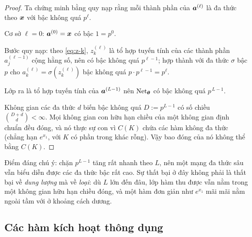 \begin{proof}
Ta chứng minh bằng quy nạp rằng mỗi thành phần của $\bm{a}^{(\ell)}$ là đa thức
theo $\bm{x}$ với bậc không quá $p^{\ell}$.
 
Cơ sở $\ell = 0$: $\bm{a}^{(0)} = \bm{x}$ có bậc $1 = p^{0}$.
 
Bước quy nạp: theo \eqref{eq:z-k}, $z^{(\ell)}_k$ là tổ hợp tuyến tính của các
thành phần $a^{(\ell-1)}_j$ cộng hằng số, nên có bậc không quá $p^{\ell-1}$; hợp
thành với đa thức $\sigma$ bậc $p$ cho $a^{(\ell)}_k = \sigma(z^{(\ell)}_k)$ bậc
không quá $p\cdot p^{\ell-1} = p^{\ell}$.
 
Lớp ra là tổ hợp tuyến tính của $\bm{a}^{(L-1)}$ nên $\operatorname{Net}_{\bm{\theta}}$ có bậc không
quá $p^{\,L-1}$.
 
Không gian các đa thức $d$ biến bậc không quá $D := p^{L-1}$ có số chiều
$\binom{D+d}{d} < \infty$. Mọi không gian con hữu hạn chiều của một không gian
định chuẩn đều đóng, và nó thực sự con vì $C(K)$ chứa các hàm không đa thức
(chẳng hạn $e^{x_1}$, với $K$ có phần trong khác rỗng). Vậy bao đóng của nó
không thể bằng $C(K)$.
\end{proof}
 
Điểm đáng chú ý: chặn $p^{L-1}$ tăng rất nhanh theo $L$, nên một mạng đa thức
sâu vẫn biểu diễn được các đa thức bậc rất cao. Sự thất bại ở đây không phải là
thất bại về \emph{dung lượng} mà về \emph{loại}: dù $L$ lớn đến đâu, lớp hàm thu
được vẫn nằm trong một không gian hữu hạn chiều đóng, và một hàm đơn giản như
$e^{x_1}$ mãi mãi nằm ngoài tầm với ở khoảng cách dương.
 
\subsection{Các hàm kích hoạt thông dụng}
 
